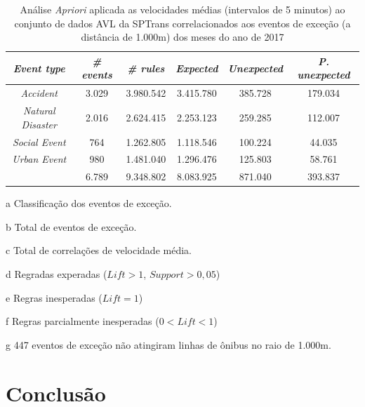 \documentclass[
	12pt,				%
	oneside,			%
	a4paper,			%
	english,			%
	brazil				%
	]{abntex2ppgsi}
\begin{document}
\begin{table}[!htb]
\centering
\begin{threeparttable}
\caption {Análise \textit{Apriori} aplicada as velocidades médias (intervalos de 5 minutos) ao conjunto de dados AVL da SPTrans correlacionados aos eventos de exceção (a distância de 1.000m) dos meses do ano de 2017}
\label {tab:aprioriFull}
\begin{tabular}{c|c|c|c|c|c}
\toprule
\textbf{\textit{Event type}}\tnote{a} & \textbf{\textit{\# events}}\tnote{b} & \textit{\textbf{\# rules}}\tnote{c} & \textbf{\textit{Expected}}\tnote{d} & \textbf{\textit{Unexpected}}\tnote{e} & \textbf{\textit{P. unexpected}}\tnote{f}   \\
\midrule
\textit{Accident} & 3.029 & 3.980.542 & 3.415.780 & 385.728 & 179.034 \\
\textit{Natural Disaster} & 2.016 & 2.624.415 & 2.253.123 & 259.285 & 112.007 \\
\textit{Social Event} & 764 & 1.262.805 & 1.118.546 & 100.224 & 44.035 \\
\textit{Urban Event} & 980 & 1.481.040 & 1.296.476 & 125.803 & 58.761 \\
\midrule
{} & 6.789 & 9.348.802 & 8.083.925 & 871.040 & 393.837 \\
\bottomrule
\end{tabular}
\begin{tablenotes}
            \item[a] Classificação dos eventos de exceção.
            \item[b] Total de eventos de exceção.
            \item[c] Total de correlações de velocidade média.
            \item[d] Regradas experadas ($Lift > 1$, $Support > 0,05$)
            \item[e] Regras inesperadas ($Lift = 1$)
            \item[f] Regras parcialmente inesperadas ($0 < Lift < 1$)
            \item[g] 447 eventos de exceção não atingiram linhas de ônibus no raio de 1.000m.
        \end{tablenotes}
\end{threeparttable}
\end{table}

\chapter{Conclusão}
\label{conclusion}
\end{document}
